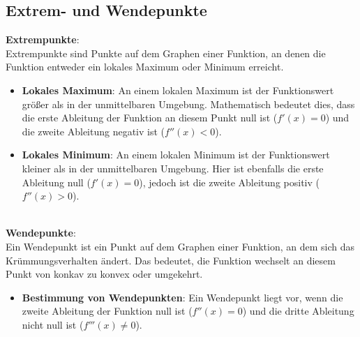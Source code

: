 \subsection{Extrem- und Wendepunkte}
\textbf{Extrempunkte}: \\
Extrempunkte sind Punkte auf dem Graphen einer Funktion, 
an denen die Funktion entweder ein lokales Maximum oder Minimum erreicht.
\begin{itemize}
    \item \textbf{Lokales Maximum}: 
        An einem lokalen Maximum ist der Funktionswert größer als in der unmittelbaren Umgebung. Mathematisch bedeutet dies, 
        dass die erste Ableitung der Funktion an diesem Punkt null ist ($f'(x)=0$) und die zweite Ableitung negativ ist ($f''(x)<0$).
    \item \textbf{Lokales Minimum}: 
        An einem lokalen Minimum ist der Funktionswert kleiner als in der unmittelbaren Umgebung. 
        Hier ist ebenfalls die erste Ableitung null ($f'(x)=0$), 
        jedoch ist die zweite Ableitung positiv ($f''(x)>0$).
\end{itemize} 
\
\\
\textbf{Wendepunkte}: \\
Ein Wendepunkt ist ein Punkt auf dem Graphen einer Funktion, 
an dem sich das Krümmungsverhalten ändert. 
Das bedeutet, die Funktion wechselt an diesem Punkt von konkav zu konvex oder umgekehrt.
\begin{itemize}
    \item \textbf{Bestimmung von Wendepunkten}: 
        Ein Wendepunkt liegt vor, 
        wenn die zweite Ableitung der Funktion null ist ($f''(x)=0$) und die dritte Ableitung nicht null ist ($f'''(x)\neq 0$). 
\end{itemize}

